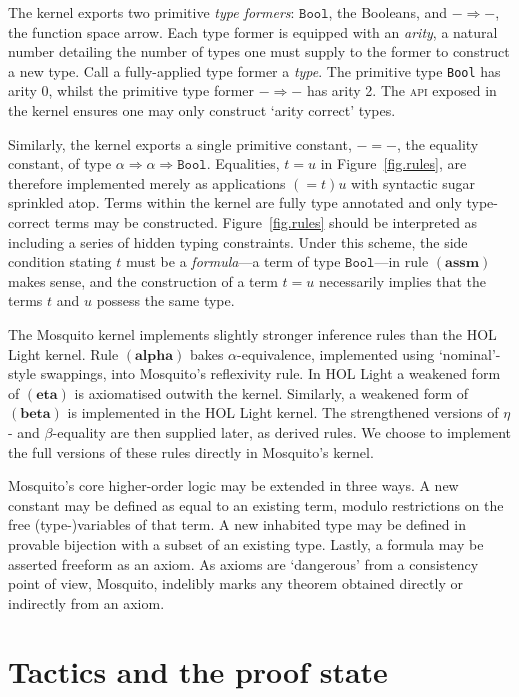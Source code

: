 \documentclass{llncs}
\newcommand{\mosquito}{Mosquito\xspace}
\newcommand{\rulefont}[1]{\ensuremath{(\mathbf{#1})}}
\begin{document}
The kernel exports two primitive \emph{type formers}: $\mathtt{Bool}$, the Booleans, and $- \Rightarrow -$, the function space arrow.
Each type former is equipped with an \emph{arity}, a natural number detailing the number of types one must supply to the former to construct a new type.
Call a fully-applied type former a \emph{type}.
The primitive type \texttt{Bool} has arity 0, whilst the primitive type former $- \Rightarrow -$ has arity 2.
The \textsc{api} exposed in the kernel ensures one may only construct `arity correct' types.

Similarly, the kernel exports a single primitive constant, $- = -$, the equality constant, of type $\alpha \Rightarrow \alpha \Rightarrow \mathtt{Bool}$.
Equalities, $t = u$ in Figure~\ref{fig.rules}, are therefore implemented merely as applications $(= t) u$ with syntactic sugar sprinkled atop.
Terms within the kernel are fully type annotated and only type-correct terms may be constructed.
Figure~\ref{fig.rules} should be interpreted as including a series of hidden typing constraints.
Under this scheme, the side condition stating $t$ must be a \emph{formula}---a term of type $\mathtt{Bool}$---in rule \rulefont{assm} makes sense, and the construction of a term $t = u$ necessarily implies that the terms $t$ and $u$ possess the same type.

The \mosquito kernel implements slightly stronger inference rules than the HOL Light kernel.
Rule \rulefont{alpha} bakes $\alpha$-equivalence, implemented using `nominal'-style swappings, into \mosquito's reflexivity rule.
In HOL Light a weakened form of \rulefont{eta} is axiomatised outwith the kernel.
Similarly, a weakened form of \rulefont{beta} is implemented in the HOL Light kernel.
The strengthened versions of $\eta$- and $\beta$-equality are then supplied later, as derived rules.
We choose to implement the full versions of these rules directly in \mosquito's kernel.

\mosquito's core higher-order logic may be extended in three ways.
A new constant may be defined as equal to an existing term, modulo restrictions on the free (type-)variables of that term.
A new inhabited type may be defined in provable bijection with a subset of an existing type.
Lastly, a formula may be asserted freeform as an axiom.
As axioms are `dangerous' from a consistency point of view, \mosquito, indelibly marks any theorem obtained directly or indirectly from an axiom.

\section{Tactics and the proof state}
\label{sect.tactics.proof.state}
\end{document}
